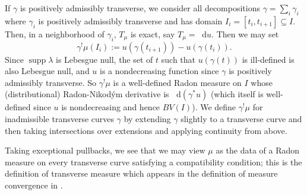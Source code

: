 \documentclass[final,12pt, leqno]{brownthesis}
\DeclareMathOperator{\supp}{supp}
\newcommand*\dif{\mathop{}\!\mathrm{d}}
\theoremstyle{definition}
\numberwithin{equation}{section}
\begin{document}
If $\gamma$ is positively admissibly transverse, we consider all decompositions $\gamma = \sum_i \gamma_i$ where $\gamma_i$ is positively admissibly transverse and has domain $I_i = [t_i, t_{i + 1}] \subseteq I$.
Then, in a neighborhood of $\gamma_i$, $T_\mu$ is exact, say $T_\mu = \dif u$. Then we may set 
$$\gamma^! \mu(I_i) := u(\gamma(t_{i + 1})) - u(\gamma(t_i)).$$
Since $\supp \lambda$ is Lebesgue null, the set of $t$ such that $u(\gamma(t))$ is ill-defined is also Lebesgue null, and $u$ is a nondecreasing function since $\gamma$ is positively admissibly transverse.
So $\gamma^! \mu$ is a well-defined Radon measure on $I$ whose (distributional) Radon-Nikod\'ym derivative is $\dif(\gamma^* u)$ (which itself is well-defined since $u$ is nondecreasing and hence $BV(I)$).
We define $\gamma^! \mu$ for inadmissible transverse curves $\gamma$ by extending $\gamma$ slightly to a transverse curve and then taking intersections over extensions and applying continuity from above.

Taking exceptional pullbacks, we see that we may view $\mu$ as the data of a Radon measure on every transverse curve satisfying a compatibility condition; this is the definition of transverse measure which appears in the definition of measure convergence in \cite[\S8.6]{thurston1979geometry}.
\end{document}
